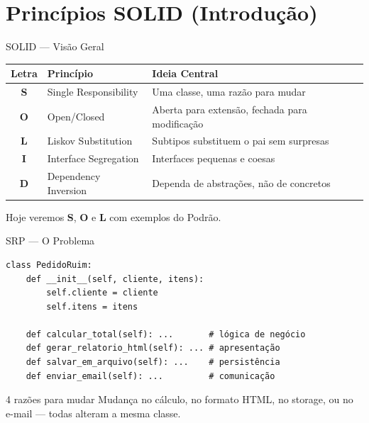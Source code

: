 \documentclass[aspectratio=169]{beamer}
\begin{document}
\section{Princípios SOLID (Introdução)}

\begin{frame}{SOLID --- Visão Geral}
\begin{table}
\centering
\begin{tabular}{cll}
\toprule
\textbf{Letra} & \textbf{Princípio} & \textbf{Ideia Central} \\
\midrule
\textbf{S} & Single Responsibility  & Uma classe, uma razão para mudar \\
\textbf{O} & Open/Closed            & Aberta para extensão, fechada para modificação \\
\textbf{L} & Liskov Substitution    & Subtipos substituem o pai sem surpresas \\
\textbf{I} & Interface Segregation  & Interfaces pequenas e coesas \\
\textbf{D} & Dependency Inversion   & Dependa de abstrações, não de concretos \\
\bottomrule
\end{tabular}
\end{table}

Hoje veremos \textbf{S}, \textbf{O} e \textbf{L} com exemplos do Podrão.
\end{frame}

\begin{frame}[fragile]{SRP --- O Problema}
\begin{lstlisting}
class PedidoRuim:
    def __init__(self, cliente, itens):
        self.cliente = cliente
        self.itens = itens

    def calcular_total(self): ...       # lógica de negócio
    def gerar_relatorio_html(self): ... # apresentação
    def salvar_em_arquivo(self): ...    # persistência
    def enviar_email(self): ...         # comunicação
\end{lstlisting}

\begin{alertblock}{4 razões para mudar}
Mudança no cálculo, no formato HTML, no storage, ou no e-mail --- todas alteram a mesma classe.
\end{alertblock}
\end{frame}
\end{document}
